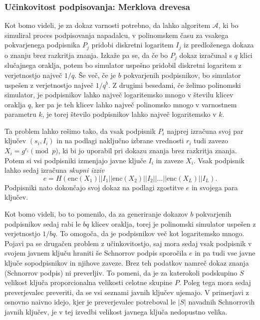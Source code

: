 \documentclass[isrm2, tisk]{fmfdelo}
\begin{document}
\subsubsection{Učinkovitost podpisovanja: Merklova drevesa}
Kot bomo videli, je za dokaz varnosti potrebno, da lahko algoritem $\mathcal{A}$, ki bo simuliral
proces podpisovanja napadalcu, v polinomskem času za vsakega pokvarjenega podpisnika $P_j$ pridobi
diskretni logaritem $I_j$ iz predloženega dokaza o znanju brez razkritja znanja. Izkaže pa se, da če
bo $P_j$ dokaz izračunal s $q$ klici slučajnega oraklja, potem bo simulator uspešno pridobil diskretni
logaritem z verjetnostjo največ $1/q$. Še več, če je $b$ pokvarjenih podpisnikov, bo simulator
uspešen z verjetnostjo največ $1/q^b$. Z drugimi besedami, če želimo polinomski simulator, je
podpisnikov lahko največ logaritemsko mnogo v številu klicev oraklja $q$, ker pa je teh klicev
lahko največ polinomsko mnogo v varnostnem parametru $k$, je torej število podpisnikov lahko
največ logaritemsko v $k$.

Ta problem lahko rešimo tako, da vsak podpisnik $P_i$ najprej izračuna svoj par ključev $(s_i, I_i)$
in na podlagi naključno izbrane vrednosti $r_i$ tudi zavezo $X_i = g^{r_i} \pmod p$, ki bi jo uporabil
pri dokazu znanja brez razkritja znanja. Potem si vsi podpisniki izmenjajo javne ključe $I_i$ in
zaveze $X_i$. Vsak podpisnik lahko sedaj izračuna \textit{skupni izziv}
$$
e = H(\text{enc}(X_1) || I_1 || \text{enc}(X_2) || I_2 || \dots || \text{enc}(X_L) || I_L).
$$
Podpisniki nato dokončajo svoj dokaz na podlagi zgostitve $e$ in svojega para ključev.

Kot bomo videli, bo to pomenilo, da za generiranje dokazov $b$ pokvarjenih podpisnikov sedaj rabi le
$bq$ klicev oraklja, torej je polinomski simulator uspešen z verjetnostjo $1/bq$. To omogoča, da je
podpisnikov več kot logaritemsko mnogo. Pojavi pa se drugačen problem z učinkovitostjo, saj mora
sedaj vsak podpisnik v svojem javnem ključu hraniti še Schnorrov podpis sporočila $e$ in pa tudi vse
javne ključe sopodpisnikov in njihove zaveze. Brez teh podatkov namreč dokaz znanja (Schnorrov podpis)
ni preverljiv. To pomeni, da je za katerokoli podskupino $S$ velikost ključa proporcionalna velikosti
celotne skupine $P$. Poleg tega mora sedaj preverjevalec preveriti, da se vsi seznami javnih ključev
ujemajo. V primerjavi z osnovno naivno idejo, kjer je preverjevalec potreboval le $|S|$ navadnih
Schnorrovih javnih ključev, je v tej izvedbi velikost javnega ključa nedopustno velika.
\end{document}
